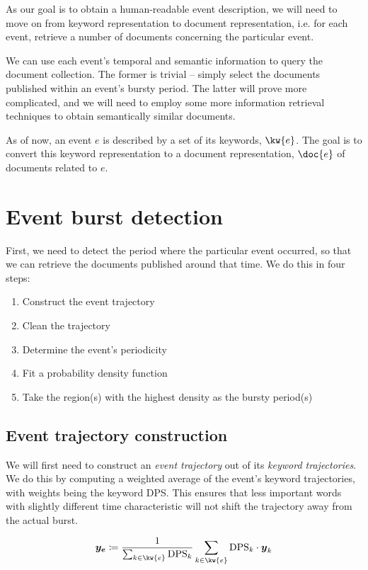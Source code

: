 As our goal is to obtain a human-readable event description, we will need to move on from keyword representation to document representation, i.e. for each event, retrieve a number of documents concerning the particular event.

We can use each event's temporal and semantic information to query the document collection. The former is trivial -- simply select the documents published within an event's bursty period. The latter will prove more complicated, and we will need to employ some more information retrieval techniques to obtain semantically similar documents.

As of now, an event $e$ is described by a set of its keywords, $\kw{e}$. The goal is to convert this keyword representation to a document representation, $\doc{e}$ of documents related to $e$.

\section{Event burst detection}
First, we need to detect the period where the particular event occurred, so that we can retrieve the documents published around that time. We do this in four steps:

\begin{enumerate}
	\item Construct the event trajectory
	\item Clean the trajectory
	\item Determine the event's periodicity
	\item Fit a probability density function
	\item Take the region(s) with the highest density as the bursty period(s)
\end{enumerate}


\subsection{Event trajectory construction}

We will first need to construct an \textit{event trajectory} out of its \textit{keyword trajectories}. We do this by computing a weighted average of the event's keyword trajectories, with weights being the keyword DPS. This ensures that less important words with slightly different time characteristic will not shift the trajectory away from the actual burst.

\begin{equation}
	\vect{\traj_{e}} \coloneqq \frac{1}{\sum_{k \in \kw{e}}{\text{DPS}_{k}}} \sum_{k \in \kw{e}}{\text{DPS}_{k} \cdot \vect{\traj}_{k}}
\end{equation}


